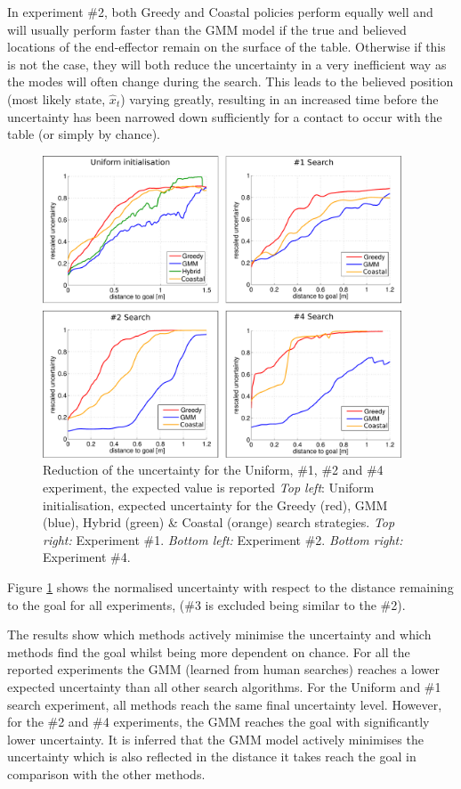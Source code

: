 In experiment \#2, both Greedy and Coastal policies perform equally well and will usually perform faster than the GMM model if the true 
and believed locations of the end-effector remain on the surface of the table. Otherwise if this is not the 
case, they will both reduce the uncertainty in a very inefficient way as the modes will often change during the search. 
This leads to the believed position (most likely state, $\hat{x}_t$) varying greatly, resulting in an increased time before the uncertainty 
has been narrowed down sufficiently for a contact to occur with the table (or simply by chance).


\begin{figure}
   \centering
  \includegraphics[width=0.95\textwidth]{./ch3-Search/Figures/Figure12}
\caption{Reduction of the uncertainty for the Uniform, \#1, \#2 and \#4 experiment, the expected value is reported
\textit{Top left}: Uniform initialisation, expected uncertainty for the Greedy (red), GMM (blue), Hybrid (green) \& Coastal (orange) search
 strategies.
\textit{Top right:} Experiment \#1. \textit{Bottom left:} Experiment \#2. \textit{Bottom right:} Experiment \#4.}
\label{fig:uncertainty}
\end{figure}


Figure \ref{fig:uncertainty} shows the normalised uncertainty with respect to the distance remaining to the goal for all experiments, 
(\#3 is excluded being similar to the \#2). 

The results show which methods actively minimise the uncertainty and which methods find the goal whilst being more dependent on chance. 
For all the reported experiments the GMM (learned from human searches) reaches a lower expected uncertainty than all other search algorithms. 
For the Uniform and \#1 search experiment, all methods reach the same final uncertainty level. However, for the \#2 and \#4 experiments, 
the GMM reaches the goal with significantly lower uncertainty. It is inferred that the GMM model actively minimises the uncertainty 
which is also reflected in the distance it takes reach the goal in comparison with the other methods.

